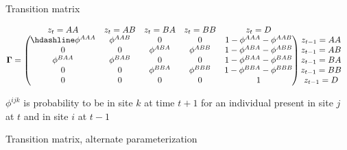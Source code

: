 \documentclass[
  12pt,
]{krantz}
\begin{document}
Transition matrix

\[\begin{matrix}
& \\
\mathbf{\Gamma} =
\left ( \vphantom{ \begin{matrix} 12 \\ 12 \\ 12 \\ 12 \\ 12\end{matrix} } \right .
\end{matrix}
\hspace{-1.2em}
\begin{matrix}
z_t=AA & z_t=AB & z_t=BA & z_t=BB & z_t=D \\ \hdashline
\phi^{AAA} & \phi^{AAB} & 0 & 0 & 1 - \phi^{AAA} - \phi^{AAB}\\
0 & 0 & \phi^{ABA} & \phi^{ABB} & 1 - \phi^{ABA} - \phi^{ABB}\\
\phi^{BAA} & \phi^{BAB} & 0 & 0 & 1 - \phi^{BAA} - \phi^{BAB}\\
0 & 0 & \phi^{BBA} & \phi^{BBB} & 1 - \phi^{BBA} - \phi^{BBB}\\
0 & 0 & 0 & 0 & 1
\end{matrix}
\hspace{-0.2em}
\begin{matrix}
& \\
\left . \vphantom{ \begin{matrix} 12 \\ 12 \\ 12 \\ 12 \\ 12\end{matrix} } \right )
\begin{matrix}
z_{t-1}=AA \\ z_{t-1}=AB \\ z_{t-1}=BA \\ z_{t-1}=BB \\ z_{t-1}=D 
\end{matrix}
\end{matrix}\]

\(\phi^{ijk}\) is probability to be in site \(k\) at time \(t + 1\) for an individual
present in site \(j\) at \(t\) and in site \(i\) at \(t - 1\)

Transition matrix, alternate parameterization
\end{document}
